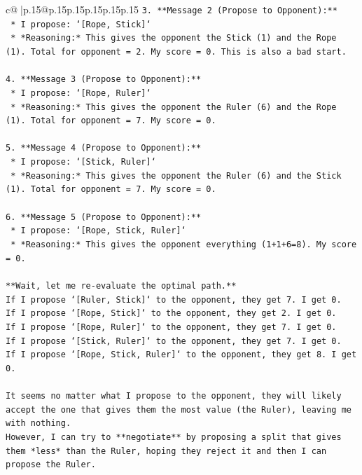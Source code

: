 \documentclass{article}
\begin{document}
{\begin{supertabular}{c@{$\;$}|p{.15\linewidth}@{}p{.15\linewidth}p{.15\linewidth}p{.15\linewidth}p{.15\linewidth}p{.15\linewidth}}
{{{\texttt{3.  **Message 2 (Propose to Opponent):**} \\
\texttt{    *   I propose: `{[}Rope, Stick{]}`} \\
\texttt{    *   *Reasoning:* This gives the opponent the Stick (1) and the Rope (1). Total for opponent = 2. My score = 0. This is also a bad start.} \\
\\ 
\texttt{4.  **Message 3 (Propose to Opponent):**} \\
\texttt{    *   I propose: `{[}Rope, Ruler{]}`} \\
\texttt{    *   *Reasoning:* This gives the opponent the Ruler (6) and the Rope (1). Total for opponent = 7. My score = 0.} \\
\\ 
\texttt{5.  **Message 4 (Propose to Opponent):**} \\
\texttt{    *   I propose: `{[}Stick, Ruler{]}`} \\
\texttt{    *   *Reasoning:* This gives the opponent the Ruler (6) and the Stick (1). Total for opponent = 7. My score = 0.} \\
\\ 
\texttt{6.  **Message 5 (Propose to Opponent):**} \\
\texttt{    *   I propose: `{[}Rope, Stick, Ruler{]}`} \\
\texttt{    *   *Reasoning:* This gives the opponent everything (1+1+6=8). My score = 0.} \\
\\ 
\texttt{**Wait, let me re{-}evaluate the optimal path.**} \\
\texttt{If I propose `{[}Ruler, Stick{]}` to the opponent, they get 7. I get 0.} \\
\texttt{If I propose `{[}Rope, Stick{]}` to the opponent, they get 2. I get 0.} \\
\texttt{If I propose `{[}Rope, Ruler{]}` to the opponent, they get 7. I get 0.} \\
\texttt{If I propose `{[}Stick, Ruler{]}` to the opponent, they get 7. I get 0.} \\
\texttt{If I propose `{[}Rope, Stick, Ruler{]}` to the opponent, they get 8. I get 0.} \\
\\ 
\texttt{It seems no matter what I propose to the opponent, they will likely accept the one that gives them the most value (the Ruler), leaving me with nothing.} \\
\texttt{However, I can try to **negotiate** by proposing a split that gives them *less* than the Ruler, hoping they reject it and then I can propose the Ruler.} \\
}}}
\end{supertabular}}
\end{document}
